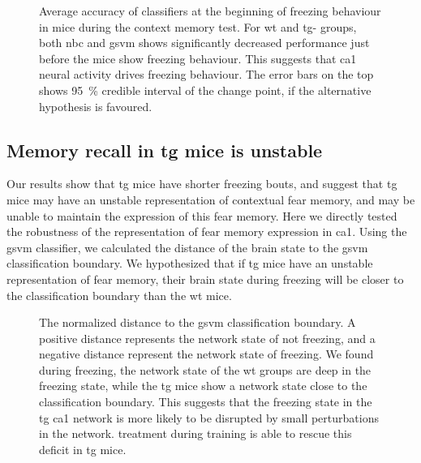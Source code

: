 \begin{figure}[h]
    \begin{subfigure}[h]{\textwidth}
        
        \caption{\label{f.ad.nb_into_f}}
    \end{subfigure}
    \begin{subfigure}[h]{\textwidth}
        
        \caption{\label{f.ad.svm_into_f}}
    \end{subfigure}
    \caption[Average classifier prediction accuracy at initiation of freezing behaviour.]{Average accuracy of classifiers at the beginning of freezing behaviour in mice during the context memory test. For \gls{wt} and \gls{tg}-\glu{} groups, both \gls{nbc} and \gls{gsvm} shows significantly decreased performance just before the mice show freezing behaviour. This suggests that \gls{ca1} neural activity drives freezing behaviour. The error bars on the top shows \SI{95}{\percent} credible interval of the change point, if the alternative hypothesis is favoured. \label{f.ad.into_f}}
\end{figure}

\subsection{Memory recall in \gls{tg} mice is unstable}
Our results show that \gls{tg} mice have shorter freezing bouts, and suggest that \gls{tg} mice may have an unstable representation of contextual fear memory, and may be unable to maintain the expression of this fear memory. Here we directly tested the robustness of the representation of fear memory expression in \gls{ca1}. Using the \gls{gsvm} classifier, we calculated the distance of the brain state to the \gls{gsvm} classification boundary. We hypothesized that if \gls{tg} mice have an unstable representation of fear memory, their brain state during freezing will be closer to the classification boundary than the \gls{wt} mice. 

\begin{figure}[h]
    
    \caption[Normalized distance to the \gls{gsvm} classification boundary.]{The normalized distance to the \gls{gsvm} classification boundary. A positive distance represents the network state of not freezing, and a negative distance represent the network state of freezing. We found during freezing, the network state of the \gls{wt} groups are deep in the freezing state, while the \gls{tg} mice show a network state close to the classification boundary. This suggests that the freezing state in the \gls{tg} \gls{ca1} network is more likely to be disrupted by small perturbations in the network. \tglu{} treatment during training is able to rescue this deficit in \gls{tg} mice. \label{f.ad.cls-distance}}
\end{figure}

